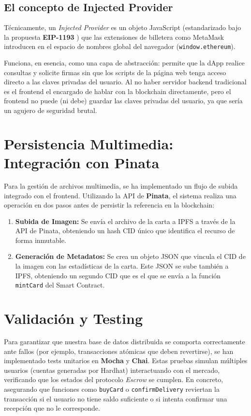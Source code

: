 \subsection{El concepto de Injected Provider}
Técnicamente, un \textit{Injected Provider} es un objeto JavaScript (estandarizado bajo la propuesta \textbf{EIP-1193} \cite{eip1193}) que 
las extensiones de billetera como MetaMask introducen en el espacio de nombres global del navegador (\texttt{window.ethereum}). 

Funciona, en esencia, como una capa de abstracción: permite que la dApp realice consultas y solicite firmas sin que los scripts 
de la página web tenga acceso directo a las claves privadas del usuario. Al no haber servidor backend tradicional es el frontend 
el encargado de hablar con la blockchain directamente, pero el frontend no puede (ni debe) guardar las claves privadas del usuario, 
ya que sería un agujero de seguridad brutal.

\section{Persistencia Multimedia: Integración con Pinata}
Para la gestión de archivos multimedia, se ha implementado un flujo de subida integrado con el frontend. Utilizando la API 
de \textbf{Pinata}, el sistema realiza una operación en dos pasos antes de persistir la referencia en la blockchain:

\begin{enumerate}
	\item \textbf{Subida de Imagen:} Se envía el archivo de la carta a IPFS a través de la API de Pinata, obteniendo un hash 
	CID único que identifica el recurso de forma inmutable.
	\item \textbf{Generación de Metadatos:} Se crea un objeto JSON que vincula el CID de la imagen con las estadísticas de la carta.
	Este JSON se sube también a IPFS, obteniendo un segundo CID que es el que se envía a la función \texttt{mintCard} del Smart Contract.
\end{enumerate}

\section{Validación y Testing}
Para garantizar que nuestra base de datos distribuida se comporta correctamente ante fallos (por ejemplo, transacciones atómicas 
que deben revertirse), se han implementado tests unitarios en \textbf{Mocha} y \textbf{Chai}. Estas pruebas simulan múltiples 
usuarios (cuentas generadas por Hardhat) interactuando con el mercado, verificando que los estados del protocolo \textit{Escrow} se cumplen.
En concreto, asegurando que funciones como \texttt{buyCard} o \texttt{confirmDelivery} reviertan la transacción si el usuario no 
tiene saldo suficiente o si intenta confirmar una recepción que no le corresponde.



